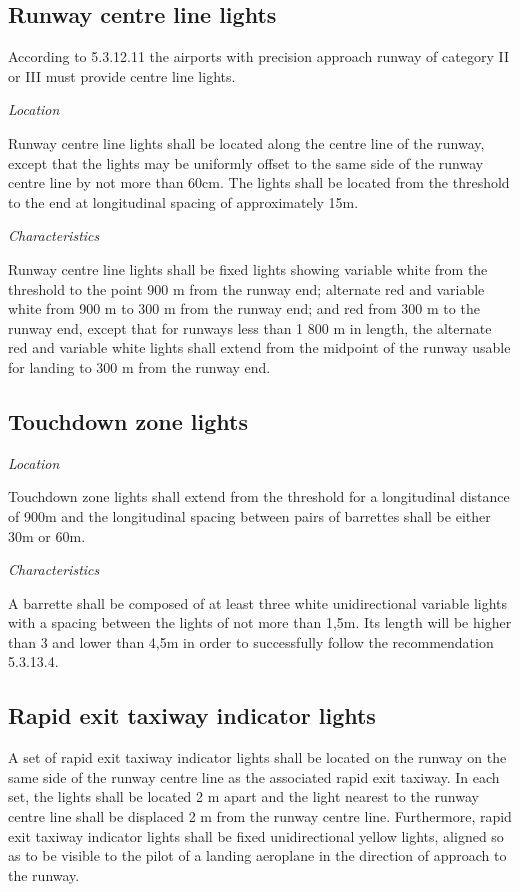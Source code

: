 		\subsection{Runway centre line lights}
		According to 5.3.12.11 the airports with precision approach runway of category II or III must provide centre line lights.
		
		 \textit{Location}
		 
		 Runway centre line lights shall be located along the centre line of the runway, except that the lights may be
		 uniformly offset to the same side of the runway centre line by not more than 60cm. The lights shall be located from the threshold to the end at longitudinal spacing of approximately 15m.
		
		\textit{Characteristics}
		
		Runway centre line lights shall be fixed lights showing variable white from the threshold to the point 900 m
		from the runway end; alternate red and variable white from 900 m to 300 m from the runway end; and red from 300 m to the
		runway end, except that for runways less than 1 800 m in length, the alternate red and variable white lights shall extend from
		the midpoint of the runway usable for landing to 300 m from the runway end.
		
		\subsection{Touchdown zone lights}
		\textit{Location}
		
		Touchdown zone lights shall extend from the threshold for a longitudinal distance of 900m and the longitudinal spacing between pairs of barrettes shall be either 30m or 60m.
		
		\textit{Characteristics}
		
		A barrette shall be composed of at least three white unidirectional variable lights with a spacing between the lights of not more than 1,5m. Its length will be higher than 3 and lower than 4,5m in order to successfully follow the recommendation 5.3.13.4.
			
		\subsection{Rapid exit taxiway indicator lights}
		A set of rapid exit taxiway indicator lights shall be located on the runway on the same side of the runway centre line as the associated rapid exit taxiway. In each set, the lights shall be located 2 m apart and the light nearest to the runway centre line shall be displaced 2 m from the runway centre line. Furthermore, rapid exit taxiway indicator lights shall be fixed unidirectional yellow lights, aligned so as to be visible to the pilot of a landing aeroplane in the direction of approach to the runway. 
		
